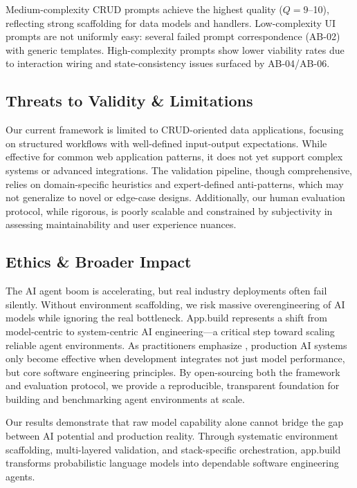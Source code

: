 \documentclass[conference]{IEEEtran}
\begin{document}
Medium-complexity CRUD prompts achieve the highest quality ($Q=9$--10), reflecting strong scaffolding for data models and handlers. Low-complexity UI prompts are not uniformly easy: several failed prompt correspondence (AB-02) with generic templates. High-complexity prompts show lower viability rates due to interaction wiring and state-consistency issues surfaced by AB-04/AB-06.

\subsection{Threats to Validity \& Limitations}
\label{sec:limitations}

Our current framework is limited to CRUD-oriented data applications, focusing on structured workflows with well-defined input-output expectations. While effective for common web application patterns, it does not yet support complex systems or advanced integrations. The validation pipeline, though comprehensive, relies on domain-specific heuristics and expert-defined anti-patterns, which may not generalize to novel or edge-case designs. Additionally, our human evaluation protocol, while rigorous, is poorly scalable and constrained by subjectivity in assessing maintainability and user experience nuances.

\subsection{Ethics \& Broader Impact}
\label{sec:broader-impact}

The AI agent boom is accelerating, but real industry deployments often fail silently. Without environment scaffolding, we risk massive overengineering of AI models while ignoring the real bottleneck. App.build represents a shift from model-centric to system-centric AI engineering—a critical step toward scaling reliable agent environments. As practitioners emphasize \cite{babushkin2025machine}, production AI systems only become effective when development integrates not just model performance, but core software engineering principles. By open-sourcing both the framework and evaluation protocol, we provide a reproducible, transparent foundation for building and benchmarking agent environments at scale.

Our results demonstrate that raw model capability alone cannot bridge the gap between AI potential and production reality. Through systematic environment scaffolding, multi-layered validation, and stack-specific orchestration, app.build transforms probabilistic language models into dependable software engineering agents.
\end{document}
